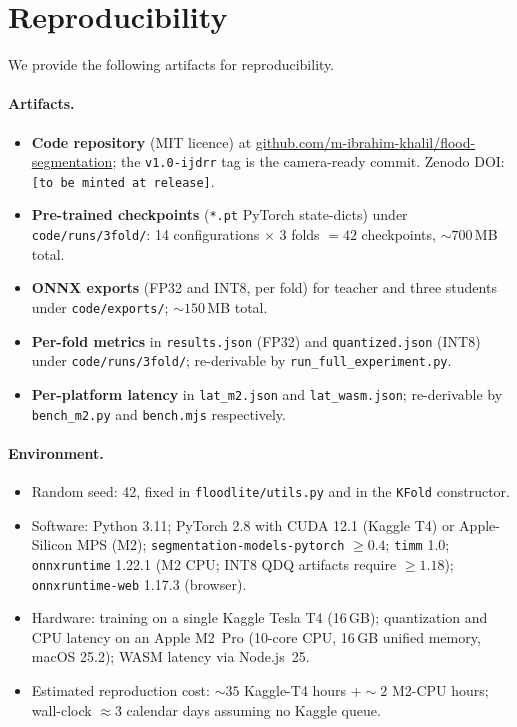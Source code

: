 
\section{Reproducibility}
\label{sec:appendix-repro}

\footnotesize
\sloppy
\setlength{\emergencystretch}{3em}

We provide the following artifacts for reproducibility.

\paragraph{Artifacts.}
\begin{itemize}\setlength\itemsep{2pt}
\item \textbf{Code repository} (MIT licence) at \url{github.com/m-ibrahim-khalil/flood-segmentation}; the \texttt{v1.0-ijdrr} tag is the camera-ready commit. Zenodo DOI: \texttt{[to be minted at release]}.
\item \textbf{Pre-trained checkpoints} (\texttt{*.pt} PyTorch state-dicts) under \texttt{code/runs/3fold/}: 14 configurations $\times$ 3 folds $= 42$ checkpoints, $\sim 700$\,MB total.
\item \textbf{ONNX exports} (FP32 and INT8, per fold) for teacher and three students under \texttt{code/exports/}; $\sim 150$\,MB total.
\item \textbf{Per-fold metrics} in \texttt{results.json} (FP32) and \texttt{quantized.json} (INT8) under \texttt{code/runs/3fold/}; re-derivable by \texttt{run\_full\_experiment.py}.
\item \textbf{Per-platform latency} in \texttt{lat\_m2.json} and \texttt{lat\_wasm.json}; re-derivable by \texttt{bench\_m2.py} and \texttt{bench.mjs} respectively.
\end{itemize}

\paragraph{Environment.}
\begin{itemize}\setlength\itemsep{2pt}
\item Random seed: 42, fixed in \texttt{floodlite/utils.py} and in the \texttt{KFold} constructor.
\item Software: Python 3.11; PyTorch 2.8 with CUDA 12.1 (Kaggle T4) or Apple-Silicon MPS (M2); \texttt{segmentation-models-pytorch} $\geq 0.4$; \texttt{timm} 1.0; \texttt{onnxruntime} 1.22.1 (M2 CPU; INT8 QDQ artifacts require $\geq 1.18$); \texttt{onnxruntime-web} 1.17.3 (browser).
\item Hardware: training on a single Kaggle Tesla T4 (16\,GB); quantization and CPU latency on an Apple M2~Pro (10-core CPU, 16\,GB unified memory, macOS 25.2); WASM latency via Node.js~25.
\item Estimated reproduction cost: $\sim 35$ Kaggle-T4 hours $+ \sim 2$ M2-CPU hours; wall-clock $\approx 3$ calendar days assuming no Kaggle queue.
\end{itemize}
